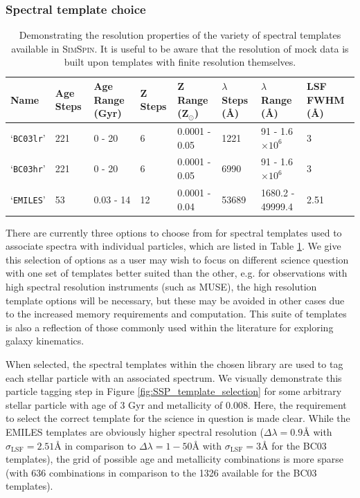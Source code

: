 \documentclass[
  journal=pasa,
  manuscript=research-paper, %
  year=2020,
  volume=37,
]{cup-journal}
\newcommand{\simspin}[1]{\textsc{SimSpin}#1} %
\newcommand{\br}[1]{\textcolor{red}{\textbf{#1}}}
\begin{document}
\subsubsection{Spectral template choice}

\begin{table}[!ht]
    \centering
   \begin{tabular}{@{}llllllll@{}}
    \toprule
    Name & Age Steps & Age Range (Gyr) & Z Steps & Z Range (Z$_{\odot}$) & $\lambda$ Steps (\AA) & $\lambda$ Range (\AA) & LSF FWHM (\AA) \\ \midrule
    `\texttt{BC03lr}' & 221 & 0 - 20 & 6 & 0.0001 - 0.05 & 1221 & 91 - 1.6$\times 10^{6}$ & 3 \\
    `\texttt{BC03hr}' & 221 & 0 - 20 & 6 & 0.0001 - 0.05 & 6990 & 91 - 1.6$\times 10^{6}$ & 3 \\
    `\texttt{EMILES}' & 53 & 0.03 - 14 & 12 & 0.0001 - 0.04 & 53689 & 1680.2 - 49999.4 & 2.51 \\ \bottomrule
    \end{tabular} 
    \caption{Demonstrating the resolution properties of the variety of spectral templates available in \simspin. It is useful to be aware that the resolution of mock data is built upon templates with finite resolution themselves.}
    \label{tab:templates}
\end{table}

There are currently three options to choose from for spectral templates used to associate spectra with individual particles, which are listed in Table \ref{tab:templates}. 
We give this selection of options as a user may wish to focus on different science question with one set of templates better suited than the other, e.g. for observations with high spectral resolution instruments (such as MUSE), the high resolution template options will be necessary, but these may be avoided in other cases due to the increased memory requirements and computation. 
This suite of templates is also a reflection of those commonly used within the literature for exploring galaxy kinematics. 


When selected, the spectral templates within the chosen library are used to tag each stellar particle with an associated spectrum.
We visually demonstrate this particle tagging step in Figure \ref{fig:SSP_template_selection} for some arbitrary stellar particle with age of 3 Gyr and metallicity of 0.008.
Here, the requirement to select the correct template for the science in question is made clear. 
While the EMILES templates are obviously higher spectral resolution ($\Delta \lambda = 0.9$\AA{} with $\sigma_{\text{LSF}} = 2.51$\AA{} in comparison to $\Delta \lambda = 1-50$\AA{} with $\sigma_{\text{LSF}} = 3$\AA{} for the BC03 templates), the grid of possible age and metallicity combinations is more sparse (with 636 combinations in comparison to the 1326 available for the BC03 templates). 
\end{document}
